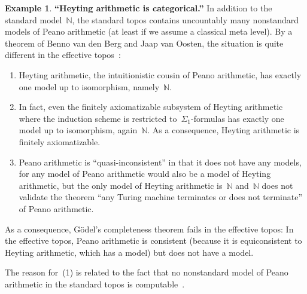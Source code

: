 \documentclass[oneside,reqno]{amsart}
\theoremstyle{definition}
\newtheorem{ex}[defn]{Example}
\theoremstyle{plain}
\theoremstyle{remark}
\newcommand{\NN}{\mathbb{N}}
\renewcommand{\_}{\mathpunct{.}\,}
\newcommand{\effective}{ef{}fective\xspace}
\newcommand{\?}{\,{:}\,}
\begin{document}
\begin{ex}\textbf{``Heyting arithmetic is categorical.''} In addition to the standard
model~$\NN$, the standard topos contains uncountably many nonstandard models of
Peano arithmetic (at least if we assume a classical meta level). By a theorem
of Benno van den Berg and Jaap van Oosten, the situation
is quite different in the \effective topos~\cite{berg-oosten:arithmetic}:
\begin{enumerate}
\item Heyting arithmetic, the intuitionistic cousin of Peano arithmetic, has
exactly one model up to isomorphism, namely~$\NN$.
\item In fact, even the finitely axiomatizable subsystem of Heyting arithmetic
where the induction scheme is restricted to~$\Sigma_1$-formulas has exactly one
model up to isomorphism, again~$\NN$. As a consequence, Heyting arithmetic is
finitely axiomatizable.
\item Peano arithmetic is ``quasi-inconsistent'' in that it does not have any
models, for any model of Peano arithmetic would also be a model of Heyting
arithmetic, but the only model of Heyting arithmetic is~$\NN$ and~$\NN$ does
not validate the theorem ``any Turing machine terminates or does not
terminate'' of Peano arithmetic.
\end{enumerate}
As a consequence, Gödel's completeness theorem fails in the \effective topos:
In the \effective topos, Peano arithmetic is consistent (because it is
equiconsistent to Heyting arithmetic, which has a model) but does not have a
model.

The reason for~(1) is related to the fact that no nonstandard model of
Peano arithmetic in the standard topos is computable~\cite{tennenbaum:models}.
\end{ex}
\end{document}
